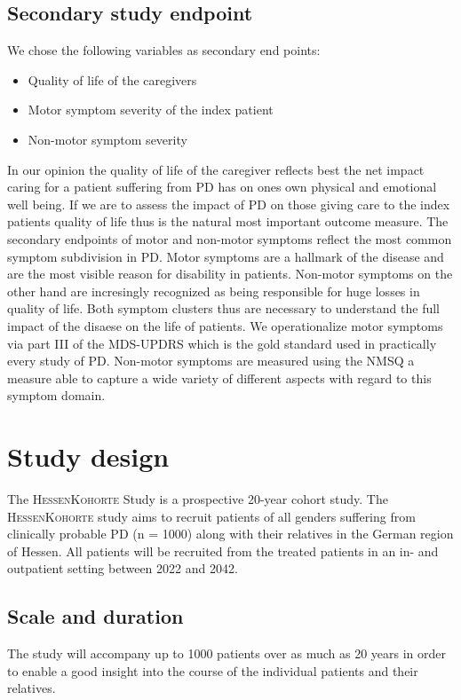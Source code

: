 \subsection{Secondary study endpoint}
We chose the following variables as secondary end points: 
\begin{itemize}
  \item Quality of life of the caregivers
  \item Motor symptom severity of the index patient
  \item Non-motor symptom severity
\end{itemize}
In our opinion the quality of life of the caregiver reflects best the net impact caring for a patient suffering from \ac{PD} has on ones own physical and emotional well being. If we are to assess the impact of \ac{PD} on those giving care to the index patients quality of life thus is the natural most important outcome measure. The secondary endpoints of motor and non-motor symptoms reflect the most common symptom subdivision in \ac{PD}. Motor symptoms are a hallmark of the disease and are the most visible reason for disability in patients. Non-motor symptoms on the other hand are incresingly recognized as being responsible for huge losses in quality of life. Both symptom clusters thus are necessary to understand the full impact of the disaese on the life of patients. We operationalize motor symptoms via part III of the \ac{MDS-UPDRS} which is the gold standard used in practically every study of \ac{PD}. Non-motor symptoms are measured using the \ac{NMSQ} a measure able to capture a wide variety of different aspects with regard to this symptom domain.


\section{Study design}
The \textsc{HessenKohorte} Study is a prospective 20-year cohort study. The \textsc{HessenKohorte} study aims to recruit patients of all genders suffering from clinically probable \ac{PD} (n = 1000) along with their relatives in the German region of Hessen. All patients will be recruited from the treated patients in an in- and outpatient setting between 2022 and 2042. 

\subsection{Scale and duration}
The study will accompany up to 1000 patients over as much as 20 years in order to enable a good insight into the course of the individual patients and their relatives.
